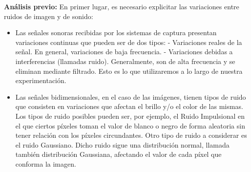 \documentclass[10pt, a4paper]{article}
\begin{document}
\begin{itemize}
\large{\textbf{An\'alisis previo:}}
En primer lugar, es necesario explicitar las variaciones entre ruidos de imagen y de sonido:\newline
\begin{itemize}
\item Las señales sonoras recibidas por los sistemas de captura presentan variaciones continuas que pueden ser de dos tipos:\newline
- Variaciones reales de la señal. En general, variaciones de baja frecuencia.\newline
- Variaciones debidas a interferencias (llamadas ruido). Generalmente, son de alta frecuencia y se eliminan mediante filtrado. Esto es lo que utilizaremos a lo largo de nuestra experimentación.\newline

\item Las señales bidimensionales, en el caso de las imágenes, tienen tipos de ruido que consisten en variaciones que afectan el brillo y/o el color de las mismas. Los tipos de ruido posibles pueden ser, por ejemplo, el Ruido Impulsional en el que ciertos píxeles toman el valor de blanco o negro de forma aleatoria sin tener relación con los píxeles circundantes.\newline
Otro tipo de ruido a considerar es el ruido Gaussiano. Dicho ruido sigue una distribución normal, llamada también distribución Gaussiana, afectando el valor de cada píxel que conforma la imagen.
\end{itemize}


\end{itemize}
\end{document}
